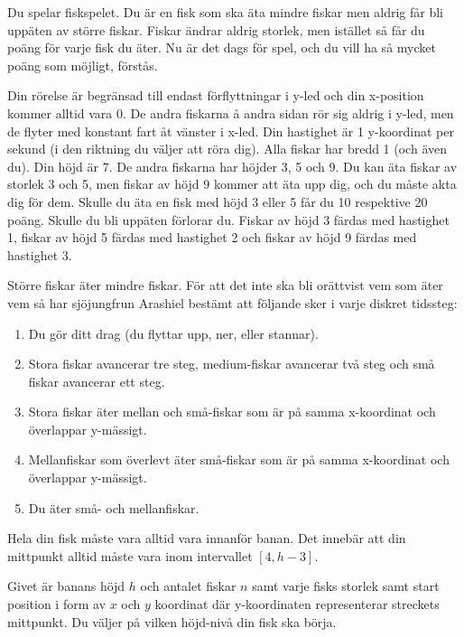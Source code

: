 
Du spelar fiskspelet. Du är en fisk som ska äta mindre fiskar men aldrig får
bli uppäten av större fiskar. Fiskar ändrar aldrig storlek, men istället så får
du poäng för varje fisk du äter. Nu är det dags för spel, och du vill ha så mycket
poäng som möjligt, förstås.

Din rörelse är begränsad till endast förflyttningar i y-led och din x-position
kommer alltid vara 0. De andra fiskarna å andra sidan rör sig aldrig i y-led,
men de flyter med konstant fart åt vänster i x-led. Din hastighet är 1
y-koordinat per sekund (i den riktning du väljer att röra dig). Alla fiskar har
bredd 1 (och även du). Din höjd är 7. De andra fiskarna har höjder 3, 5 och
9. Du kan äta fiskar av storlek 3 och 5, men fiskar av höjd 9 kommer att äta
upp dig, och du måste akta dig för dem. Skulle du äta en fisk med höjd 3 eller
5 får du 10 respektive 20 poäng. Skulle du bli uppäten förlorar du. Fiskar av
höjd 3 färdas med hastighet 1, fiskar av höjd 5 färdas med hastighet 2 och
fiskar av höjd 9 färdas med hastighet 3.

Större fiskar äter mindre fiskar. För att det inte ska bli orättvist vem som
äter vem så har sjöjungfrun Arashiel bestämt att följande sker i varje diskret
tidssteg:

\begin{enumerate}
  \item
     Du gör ditt drag (du flyttar upp, ner, eller stannar).
  \item
     Stora fiskar avancerar tre steg, medium-fiskar avancerar två steg och små fiskar avancerar ett steg.
  \item
     Stora fiskar äter mellan och små-fiskar som är på samma x-koordinat och överlappar y-mässigt.
  \item
     Mellanfiskar som överlevt äter små-fiskar som är på samma x-koordinat och överlappar y-mässigt.
  \item
     Du äter små- och mellanfiskar.
\end{enumerate}

Hela din fisk måste vara alltid vara innanför banan. Det innebär att
din mittpunkt alltid måste vara inom intervallet $[4, h-3]$.

Givet är banans höjd $h$ och antalet fiskar $n$ samt
varje fisks storlek samt start position i form av $x$ och $y$ koordinat där y-koordinaten
representerar streckets mittpunkt. Du väljer på vilken höjd-nivå din fisk ska börja.

